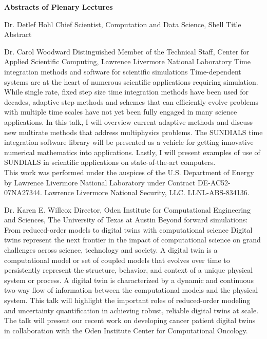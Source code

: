 \begin{center}
{\Large \bfseries Abstracts of Plenary Lectures}
\end{center}
\vspace{1ex}


\label{plenary1}
\plenabs
{Dr. Detlef Hohl}
{Chief Scientist, Computation and Data Science, Shell}
{Title}
{Abstract}
\bigskip


\label{plenary2}
\plenabs
{Dr. Carol Woodward}
{Distinguished Member of the Technical Staff, Center for Applied Scientific Computing, Lawrence Livermore National Laboratory}
{Time integration methods and software for scientific simulations}
{Time-dependent systems are at the heart of numerous scientific applications requiring simulation. While single rate, fixed step size time integration methods have been used for decades, adaptive step methods and schemes that can efficiently evolve problems with multiple time scales have not yet been fully engaged in many science applications. In this talk, I will overview current adaptive methods and discuss new multirate methods that address multiphysics problems. The SUNDIALS time integration software library will be presented as a vehicle for getting innovative numerical mathematics into applications. Lastly, I will present examples of use of SUNDIALS in scientific applications on state-of-the-art computers.\\
This work was performed under the auspices of the U.S. Department of Energy by Lawrence Livermore National Laboratory under Contract DE-AC52-07NA27344. Lawrence Livermore National Security, LLC. LLNL-ABS-834136.}
\bigskip


\label{plenary3}
\plenabs
{Dr. Karen E. Willcox}
{Director, Oden Institute for Computational Engineering and Sciences, The University of Texas at Austin}
{Beyond forward simulations: From reduced-order models to digital twins with computational science}
{Digital twins represent the next frontier in the impact of computational science on grand challenges across science, technology and society. A digital twin is a computational model or set of coupled models that evolves over time to persistently represent the structure, behavior, and context of a unique physical system or process. A digital twin is characterized by a dynamic and continuous two-way flow of information between the computational models and the physical system. This talk will highlight the important roles of reduced-order modeling and uncertainty quantification in achieving robust, reliable digital twins at scale. The talk will present our recent work on developing cancer patient digital twins in collaboration with the Oden Institute Center for Computational Oncology.}
\bigskip


